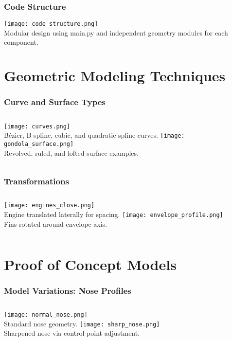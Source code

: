 \documentclass{beamer}
\begin{document}
\begin{frame}
    \frametitle{Code Structure}
    \texttt{[image: code\_structure.png]}\\[0.5em]
    \small Modular design using main.py and independent geometry modules for each component.
\end{frame}

\section{Geometric Modeling Techniques}
\begin{frame}
    \frametitle{Curve and Surface Types}
    \begin{columns}
        \texttt{[image: curves.png]}\\
        \small\centering B\'ezier, B-spline, cubic, and quadratic spline curves.
        \texttt{[image: gondola\_surface.png]}\\
        \small\centering Revolved, ruled, and lofted surface examples.
    \end{columns}
\end{frame}

\begin{frame}
    \frametitle{Transformations}
    \begin{columns}
        \texttt{[image: engines\_close.png]}\\
        \small\centering Engine translated laterally for spacing.
        \texttt{[image: envelope\_profile.png]}\\
        \small\centering Fins rotated around envelope axis.
    \end{columns}
\end{frame}

\section{Proof of Concept Models}
\begin{frame}
    \frametitle{Model Variations: Nose Profiles}
    \begin{columns}
        \texttt{[image: normal\_nose.png]}\\
        \small\centering Standard nose geometry.
        \texttt{[image: sharp\_nose.png]}\\
        \small\centering Sharpened nose via control point adjustment.
    \end{columns}
\end{frame}
\end{document}
